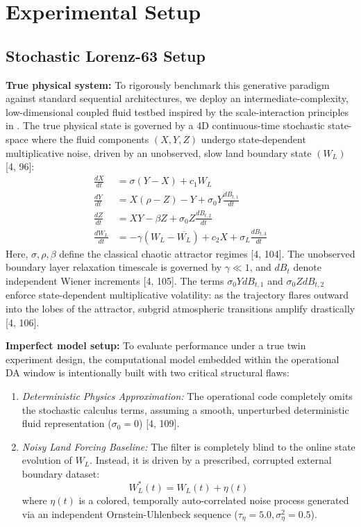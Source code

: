 \documentclass[10pt]{article}
\begin{document}
\section{Experimental Setup}

\subsection{Stochastic Lorenz-63 Setup}

{\bf True physical system:} To rigorously benchmark this generative paradigm against standard sequential architectures, we deploy an intermediate-complexity, low-dimensional coupled fluid testbed inspired by the scale-interaction principles in \cite{chapron_large_2018}. The true physical state is governed by a 4D continuous-time stochastic state-space where the fluid components $(X, Y, Z)$ undergo state-dependent multiplicative noise, driven by an unobserved, slow land boundary state $(W_{L})$ [4, 96]:
\begin{align}
    \frac{dX}{dt} &= \sigma(Y-X) + c_{1}W_{L} \label{eq:l63_1} \\
    \frac{dY}{dt} &= X(\rho-Z) - Y + \sigma_{0}Y\frac{dB_{t,1}}{dt} \label{eq:l63_2} \\
    \frac{dZ}{dt} &= XY - \beta Z + \sigma_{0}Z\frac{dB_{t,2}}{dt} \label{eq:l63_3} \\
    \frac{dW_{L}}{dt} &= -\gamma(W_{L}-\overline{W_{L}}) + c_{2}X + \sigma_{L}\frac{dB_{t,3}}{dt} \label{eq:l63_4}
\end{align}
Here, $\sigma, \rho, \beta$ define the classical chaotic attractor regimes [4, 104]. The unobserved boundary layer relaxation timescale is governed by $\gamma\ll1$, and $dB_{t}$ denote independent Wiener increments [4, 105]. The terms $\sigma_{0}YdB_{t,1}$ and $\sigma_{0}ZdB_{t,2}$ enforce state-dependent multiplicative volatility: as the trajectory flares outward into the lobes of the attractor, subgrid atmospheric transitions amplify drastically [4, 106].

{\bf Imperfect model setup:} To evaluate performance under a true twin experiment design, the computational model embedded within the operational DA window is intentionally built with two critical structural flaws:
\begin{enumerate}
    \item \textit{Deterministic Physics Approximation:} The operational code completely omits the stochastic calculus terms, assuming a smooth, unperturbed deterministic fluid representation ($\sigma_{0}=0$) [4, 109].
    \item \textit{Noisy Land Forcing Baseline:} The filter is completely blind to the online state evolution of $W_{L}$. Instead, it is driven by a prescribed, corrupted external boundary dataset:
    \begin{equation}
        W_{L}^{*}(t) = W_{L}(t) + \eta(t)
    \end{equation}
    where $\eta(t)$ is a colored, temporally auto-correlated noise process generated via an independent Ornstein-Uhlenbeck sequence ($\tau_{\eta}=5.0, \sigma_{\eta}^{2}=0.5$).
\end{enumerate}
\end{document}
